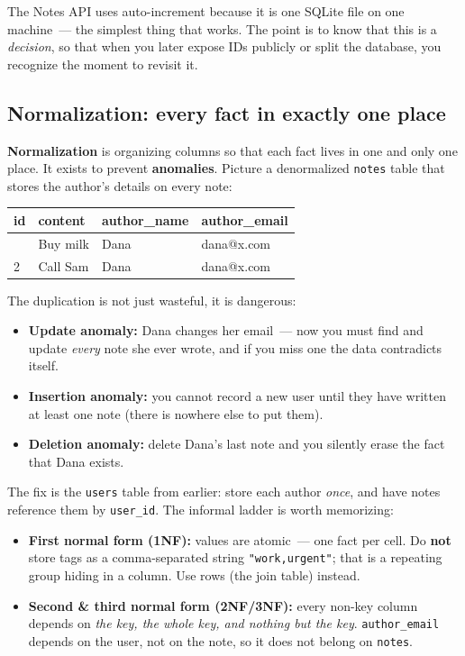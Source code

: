\noindent{}The Notes API uses auto-increment because it is one SQLite file on one machine~--- the simplest thing that works. The point is to know that this is a \emph{decision}, so that when you later expose IDs publicly or split the database, you recognize the moment to revisit it.

\subsection*{Normalization: every fact in exactly one place}\label{06-local-dependencies:normalization-every-fact-in-exactly-one-place}

\textbf{Normalization} is organizing columns so that each fact lives in one and only one place. It exists to prevent \textbf{anomalies}. Picture a denormalized \texttt{notes} table that stores the author's details on every note:


{\def\LTcaptype{none} %
\begin{longtable}[]{@{}llll@{}}
\toprule\noalign{}
id & content & author\_name & author\_email \\
\midrule\noalign{}
\endhead
\bottomrule\noalign{}
\endlastfoot
1 & Buy milk & Dana & dana@x.com \\
2 & Call Sam & Dana & dana@x.com \\
\end{longtable}
}

The duplication is not just wasteful, it is dangerous:

\begin{itemize}
\tightlist
\item
  \textbf{Update anomaly:} Dana changes her email~--- now you must find and update \emph{every} note she ever wrote, and if you miss one the data contradicts itself.
\item
  \textbf{Insertion anomaly:} you cannot record a new user until they have written at least one note (there is nowhere else to put them).
\item
  \textbf{Deletion anomaly:} delete Dana's last note and you silently erase the fact that Dana exists.
\end{itemize}

\noindent{}The fix is the \texttt{users} table from earlier: store each author \emph{once}, and have notes reference them by \texttt{user\_id}. The informal ladder is worth memorizing:

\begin{itemize}
\tightlist
\item
  \textbf{First normal form (1NF):} values are atomic~--- one fact per cell. Do \textbf{not} store tags as a comma-separated string \texttt{"work,urgent"}; that is a repeating group hiding in a column. Use rows (the join table) instead.
\item
  \textbf{Second \& third normal form (2NF/3NF):} every non-key column depends on \emph{the key, the whole key, and nothing but the key}. \texttt{author\_email} depends on the user, not on the note, so it does not belong on \texttt{notes}.
\end{itemize}

